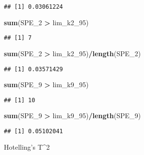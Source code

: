 \documentclass[
]{article}
\newenvironment{Shaded}{\begin{snugshade}}{\end{snugshade}}
\newcommand{\DecValTok}[1]{\textcolor[rgb]{0.00,0.00,0.81}{#1}}
\newcommand{\KeywordTok}[1]{\textcolor[rgb]{0.13,0.29,0.53}{\textbf{#1}}}
\newcommand{\NormalTok}[1]{#1}
\newcommand{\OperatorTok}[1]{\textcolor[rgb]{0.81,0.36,0.00}{\textbf{#1}}}
\newcommand{\StringTok}[1]{\textcolor[rgb]{0.31,0.60,0.02}{#1}}
\begin{document}
\begin{verbatim}
## [1] 0.03061224
\end{verbatim}

\begin{Shaded}
\begin{Highlighting}[]
\KeywordTok{sum}\NormalTok{(SPE_}\DecValTok{2} \OperatorTok{>}\StringTok{ }\NormalTok{lim_k2_}\DecValTok{95}\NormalTok{)}
\end{Highlighting}
\end{Shaded}

\begin{verbatim}
## [1] 7
\end{verbatim}

\begin{Shaded}
\begin{Highlighting}[]
\KeywordTok{sum}\NormalTok{(SPE_}\DecValTok{2} \OperatorTok{>}\StringTok{ }\NormalTok{lim_k2_}\DecValTok{95}\NormalTok{)}\OperatorTok{/}\KeywordTok{length}\NormalTok{(SPE_}\DecValTok{2}\NormalTok{)}
\end{Highlighting}
\end{Shaded}

\begin{verbatim}
## [1] 0.03571429
\end{verbatim}

\begin{Shaded}
\begin{Highlighting}[]
\KeywordTok{sum}\NormalTok{(SPE_}\DecValTok{9} \OperatorTok{>}\StringTok{ }\NormalTok{lim_k9_}\DecValTok{95}\NormalTok{)}
\end{Highlighting}
\end{Shaded}

\begin{verbatim}
## [1] 10
\end{verbatim}

\begin{Shaded}
\begin{Highlighting}[]
\KeywordTok{sum}\NormalTok{(SPE_}\DecValTok{9} \OperatorTok{>}\StringTok{ }\NormalTok{lim_k9_}\DecValTok{95}\NormalTok{)}\OperatorTok{/}\KeywordTok{length}\NormalTok{(SPE_}\DecValTok{9}\NormalTok{)}
\end{Highlighting}
\end{Shaded}

\begin{verbatim}
## [1] 0.05102041
\end{verbatim}

Hotelling's T\^{}2
\end{document}
